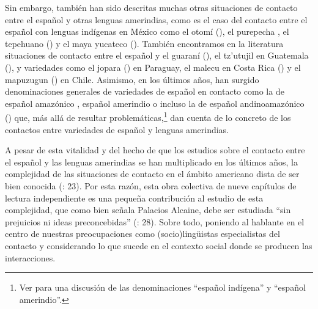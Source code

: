 \documentclass[output=paper]{langscibook}
\begin{document}
Sin embargo, también han sido descritas muchas otras situaciones de contacto entre el español y otras lenguas amerindias, como es el caso del contacto entre el español con lenguas indígenas en México como
el otomí (\citealt{Zimmermann1986,GuerreroGalván2009othobui}),
el purepecha \citep{Chamoreau2007},
el tepehuano (\citealt{TorresSánchez2015}) y
el maya yucateco (\citealt{HernándezMéndez2017}). También encontramos en la literatura situaciones de contacto entre el español y el guaraní (\citealt{DeGranda1988,PennerEtAl2012,PalaciosAlcaine2019b,GómezRendón2007,Blestel2015habiasido,BlestelFontanier2017}),
el tz'utujil en Guatemala (\citealt{GarcíaTesoro2005}), y variedades como
el jopara (\citealt{Zajícová2014,Blestel2019}) en Paraguay,
el malecu en Costa Rica (\citealt{SánchezAvendaño2017}) y
el mapuzugun (\citealt{OlateVinet2017,OlateVinetWittigGonzález2019}) en Chile. Asimismo, en los últimos años, han surgido denominaciones generales de variedades de español en contacto como la de español amazónico \citep{Jara2017}, español amerindio o incluso la de español andinoamazónico (\citealt{RamírezCruz2009}) que, más allá de resultar problemáticas,\footnote{Ver \citet{Zimmermann2016} para una discusión de las denominaciones “español indígena” y “español amerindio”.} dan cuenta de lo concreto de los contactos entre variedades de español y lenguas amerindias.

A pesar de esta vitalidad y del hecho de que los estudios sobre el contacto entre el español y las lenguas amerindias se han multiplicado en los últimos años, la complejidad de las situaciones de contacto en el ámbito americano dista de ser bien conocida (\citealt{PalaciosAlcaine2019a}: 23). Por esta razón, esta obra colectiva de nueve capítulos de lectura independiente es una pequeña contribución al estudio de esta complejidad, que como bien señala Palacios Alcaine, debe ser estudiada “sin prejuicios ni ideas preconcebidas” (\citealt{PalaciosAlcaine2019a}: 28). Sobre todo, poniendo al hablante en el centro de nuestras preocupaciones como (socio)lingüistas especialistas del contacto y considerando lo que sucede en el contexto social donde se producen las interacciones.
\end{document}
